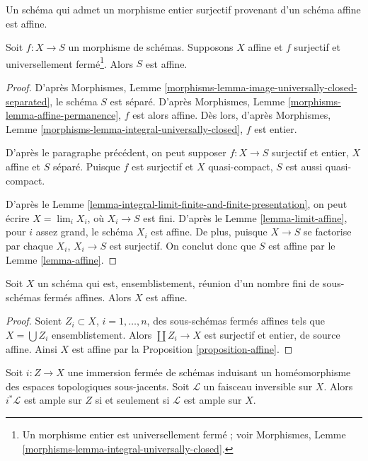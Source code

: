 \begin{proposition}
\label{proposition-affine}
\begin{slogan}
Un schéma qui admet un morphisme entier surjectif provenant d'un schéma affine est affine.
\end{slogan}
Soit $f : X \to S$ un morphisme de schémas. Supposons $X$ affine
et $f$ surjectif et universellement fermé\footnote{Un morphisme entier
est universellement fermé ; voir
Morphismes, Lemme \ref{morphisms-lemma-integral-universally-closed}.}.
Alors $S$ est affine.
\end{proposition}

\begin{proof}
D'après Morphismes, Lemme \ref{morphisms-lemma-image-universally-closed-separated},
le schéma $S$ est séparé. D'après
Morphismes, Lemme \ref{morphisms-lemma-affine-permanence},
$f$ est alors affine. Dès lors, d'après
Morphismes, Lemme \ref{morphisms-lemma-integral-universally-closed},
$f$ est entier.

\medskip\noindent
D'après le paragraphe précédent, on peut supposer $f : X \to S$
surjectif et entier, $X$ affine et $S$ séparé.
Puisque $f$ est surjectif et $X$ quasi-compact, $S$ est aussi
quasi-compact.

\medskip\noindent
D'après le Lemme \ref{lemma-integral-limit-finite-and-finite-presentation},
on peut écrire $X = \lim_i X_i$, où $X_i \to S$ est fini. D'après le
Lemme \ref{lemma-limit-affine},
pour $i$ assez grand, le schéma $X_i$ est affine.
De plus, puisque $X \to S$ se factorise par chaque $X_i$,
$X_i \to S$ est surjectif. On conclut donc que $S$ est affine par le
Lemme \ref{lemma-affine}.
\end{proof}

\begin{lemma}
\label{lemma-affines-glued-in-closed-affine}
Soit $X$ un schéma qui est, ensemblistement, réunion d'un
nombre fini de sous-schémas fermés affines. Alors $X$ est affine.
\end{lemma}

\begin{proof}
Soient $Z_i \subset X$, $i = 1, \ldots, n$, des sous-schémas fermés affines tels que
$X = \bigcup Z_i$ ensemblistement. Alors $\coprod Z_i \to X$ est surjectif
et entier, de source affine. Ainsi $X$ est affine par la
Proposition \ref{proposition-affine}.
\end{proof}

\begin{lemma}
\label{lemma-ample-on-reduction}
Soit $i : Z \to X$ une immersion fermée de schémas
induisant un homéomorphisme des espaces topologiques sous-jacents.
Soit $\mathcal{L}$ un faisceau inversible sur $X$.
Alors $i^*\mathcal{L}$ est ample sur $Z$ si et seulement si $\mathcal{L}$
est ample sur $X$.
\end{lemma}


